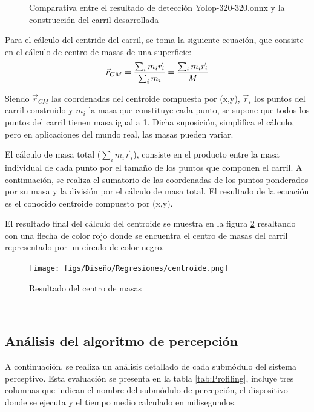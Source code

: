 \begin{figure}[H]
  \caption{Comparativa entre el resultado de detección Yolop-320-320.onnx y la construcción del carril desarrollada}
  \label{comparativa-interpolacion}
\end{figure}

Para el cálculo del centride del carril, se toma la siguiente ecuación, que consiste en el cálculo de centro de masas de una superficie: \newline
  \begin{equation} 
    \vec{r}_{CM} = \frac{\sum_{i}m_{i} \vec{r}_{i}}{\sum_{i}m_{i}} = \frac{\sum_{i}m_{i} \vec{r}_{i}}{M} 
    \newline
  \end{equation} 

  Siendo $\vec{r}_{CM}$ las coordenadas del centroide compuesta por (x,y), $\vec{r}_{i}$ los puntos del carril construido y $m_{i}$ la masa que constituye cada punto, se supone que todos 
  los puntos del carril tienen masa igual a 1. Dicha suposición, simplifica el cálculo, pero en aplicaciones del mundo real, las masas pueden variar. 

  El cálculo de masa total ($\sum_{i}m_{i} \vec{r}_{i}$), consiste en el producto entre la masa individual de cada punto por el tamaño de los puntos que componen el carril. A continuación, 
  se realiza el sumatorio de las coordenadas de los puntos ponderados por su masa y la división por el cálculo de masa total. El resultado de la ecuación es el conocido centroide 
  compuesto por (x,y). \newline
  
  El resultado final del cálculo del centroide se muestra en la figura \ref{fig:centro de masas} resaltando con una flecha de color rojo donde se encuentra
  el centro de masas del carril representado por un círculo de color negro.

  \begin{figure} [H]
    \begin{center}
      \texttt{[image: figs/Diseño/Regresiones/centroide.png]}
    \end{center}
    \caption{Resultado del centro de masas}
    \label{fig:centro de masas}
  \end{figure}\

  \subsection{Análisis del algoritmo de percepción}
  \label{sec:Análisis del algoritmo de percepción}
  A continuación, se realiza un análisis detallado de cada submódulo del sistema perceptivo. Esta evaluación se presenta en la tabla \ref{tab:Profiling}, incluye 
  tres columnas que indican el nombre del submódulo de percepción, el dispositivo donde se ejecuta y el tiempo medio calculado en milisegundos.

